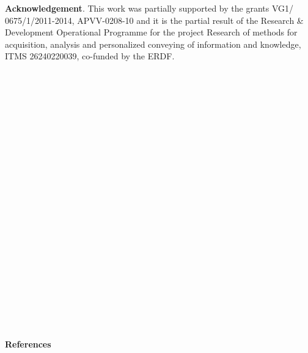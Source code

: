 \documentclass{llncs}
\begin{document}
\noindent \textbf{Acknowledgement}. This work was partially supported by the grants VG1/
0675/1/2011-2014, APVV-0208-10 and it is the partial result of the Research \& Development
Operational Programme for the project Research of methods for acquisition,
analysis and personalized conveying of information and knowledge, ITMS
26240220039, co-funded by the ERDF.
 \\ \\\\\\\\\\\\\\\\\\\\\\\\\\\\\\\\\\\\\\\\\\\\\\
\textbf{References}  \\
\end{document}
